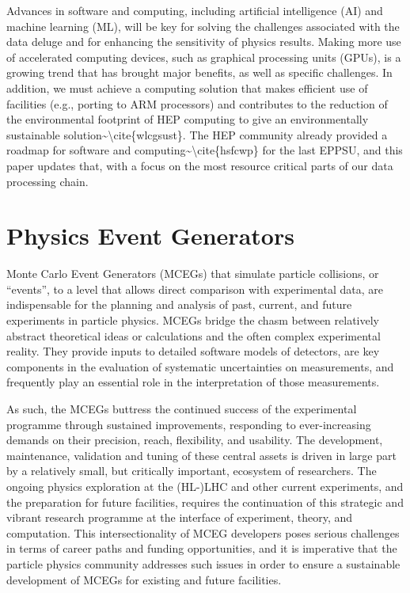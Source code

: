 Advances in software and computing, including artificial intelligence
(AI) and machine learning (ML), will be key for solving the challenges
associated with the data deluge and for enhancing the sensitivity of
physics results. Making more use of accelerated computing devices, such
as graphical processing units (GPUs), is a growing trend that has
brought major benefits, as well as specific challenges. In addition, we
must achieve a computing solution that makes efficient use of facilities
(e.g., porting to ARM processors) and contributes to the reduction of
the environmental footprint of HEP computing to give an environmentally
sustainable solution\textasciitilde\textbackslash cite\{wlcgsust\}. The
HEP community already provided a roadmap for software and
computing\textasciitilde\textbackslash cite\{hsfcwp\} for the last
EPPSU, and this paper updates that, with a focus on the most resource
critical parts of our data processing chain.

\section{Physics Event Generators}\label{physics-event-generators}

Monte Carlo Event Generators (MCEGs) that simulate particle collisions,
or ``events'', to a level that allows direct comparison with
experimental data, are indispensable for the planning and analysis of
past, current, and future experiments in particle physics. MCEGs bridge
the chasm between relatively abstract theoretical ideas or calculations
and the often complex experimental reality. They provide inputs to
detailed software models of detectors, are key components in the
evaluation of systematic uncertainties on measurements, and frequently
play an essential role in the interpretation of those measurements.

As such, the MCEGs buttress the continued success of the experimental
programme through sustained improvements, responding to ever-increasing
demands on their precision, reach, flexibility, and usability. The
development, maintenance, validation and tuning of these central assets
is driven in large part by a relatively small, but critically important,
ecosystem of researchers. The ongoing physics exploration at the
(HL-)LHC and other current experiments, and the preparation for future
facilities, requires the continuation of this strategic and vibrant
research programme at the interface of experiment, theory, and
computation. This intersectionality of MCEG developers poses serious
challenges in terms of career paths and funding opportunities, and it is
imperative that the particle physics community addresses such issues in
order to ensure a sustainable development of MCEGs for existing and
future facilities.

